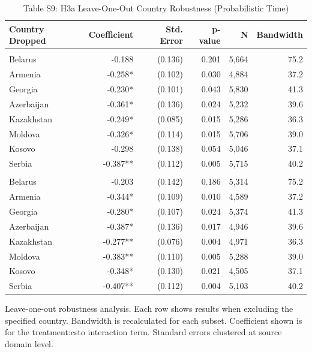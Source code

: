 \begin{table}[!t]
\caption*{
{\large Table S9: H3a Leave-One-Out Country Robustness (Probabilistic Time)}
} 
\fontsize{12.0pt}{14.4pt}\selectfont
\begin{tabular*}{\linewidth}{@{\extracolsep{\fill}}lrrrrr}
\toprule
Country Dropped & Coefficient & Std. Error & p-value & N & Bandwidth \\ 
\midrule\addlinespace[2.5pt]
\multicolumn{6}{l}{Standard Model} \\[2.5pt] 
\midrule\addlinespace[2.5pt]
Belarus & -0.188 & (0.136) & 0.201 & 5,664 & 75.2 \\ 
Armenia & -0.258* & (0.102) & 0.030 & 4,884 & 37.2 \\ 
Georgia & -0.230* & (0.101) & 0.043 & 5,830 & 41.3 \\ 
Azerbaijan & -0.361* & (0.136) & 0.024 & 5,232 & 39.6 \\ 
Kazakhstan & -0.249* & (0.085) & 0.015 & 5,286 & 36.3 \\ 
Moldova & -0.326* & (0.114) & 0.015 & 5,706 & 39.0 \\ 
Kosovo & -0.298 & (0.138) & 0.054 & 5,046 & 37.1 \\ 
Serbia & -0.387** & (0.112) & 0.005 & 5,715 & 40.2 \\ 
\midrule\addlinespace[2.5pt]
\multicolumn{6}{l}{Matched Model} \\[2.5pt] 
\midrule\addlinespace[2.5pt]
Belarus & -0.203 & (0.142) & 0.186 & 5,314 & 75.2 \\ 
Armenia & -0.344* & (0.109) & 0.010 & 4,589 & 37.2 \\ 
Georgia & -0.280* & (0.107) & 0.024 & 5,374 & 41.3 \\ 
Azerbaijan & -0.387* & (0.136) & 0.017 & 4,946 & 39.6 \\ 
Kazakhstan & -0.277** & (0.076) & 0.004 & 4,971 & 36.3 \\ 
Moldova & -0.383** & (0.110) & 0.005 & 5,288 & 39.0 \\ 
Kosovo & -0.348* & (0.130) & 0.021 & 4,505 & 37.1 \\ 
Serbia & -0.407** & (0.112) & 0.004 & 5,103 & 40.2 \\ 
\bottomrule
\end{tabular*}
\begin{minipage}{\linewidth}
Leave-one-out robustness analysis. Each row shows results when excluding the
specified country. Bandwidth is recalculated for each subset. Coefficient shown
is for the treatment:csto interaction term. Standard errors clustered at source
domain level.\\
\end{minipage}
\end{table}

